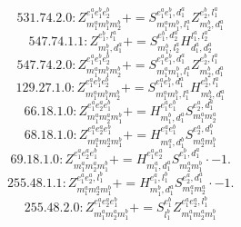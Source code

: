 \documentclass[letterpaper,10pt,fleqn,leqno,onecolumn]{article}
\begin{document}
\begin{equation} \;\;\;\;\;\;  531.74.2.0: Z^{e_{1}^{a}e_{1}^{b}e_{2}^{b}}_{m_{1}^{a}m_{1}^{b}m_{2}^{b}}+=S^{e_{1}^{a}e_{1}^{b},d_{1}^{a}}_{m_{1}^{a}m_{1}^{b},l_{1}^{a}}Z^{e_{2}^{b},l_{1}^{a}}_{m_{2}^{b},d_{1}^{a}} \end{equation}
\begin{equation} \;\;\;\;\;\;  547.74.1.1: Z^{e_{1}^{b},l_{1}^{a}}_{m_{1}^{b},d_{1}^{a}}+=S^{e_{1}^{b},d_{2}^{a}}_{m_{1}^{b},l_{2}^{a}}H^{l_{1}^{a},l_{2}^{a}}_{d_{1}^{a},d_{2}^{a}} \end{equation}
\begin{equation} \;\;\;\;\;\;  547.74.2.0: Z^{e_{1}^{a}e_{1}^{b}e_{2}^{b}}_{m_{1}^{a}m_{1}^{b}m_{2}^{b}}+=S^{e_{1}^{a}e_{1}^{b},d_{1}^{a}}_{m_{1}^{a}m_{1}^{b},l_{1}^{a}}Z^{e_{2}^{b},l_{1}^{a}}_{m_{2}^{b},d_{1}^{a}} \end{equation}
\begin{equation} \;\;\;\;\;\;  129.27.1.0: Z^{e_{1}^{a}e_{1}^{b}e_{2}^{b}}_{m_{1}^{a}m_{1}^{b}m_{2}^{b}}+=S^{e_{1}^{a}e_{1}^{b},d_{1}^{a}}_{m_{1}^{a}m_{1}^{b},l_{1}^{a}}H^{e_{2}^{b},l_{1}^{a}}_{m_{2}^{b},d_{1}^{a}} \end{equation}
\begin{equation} \;\;\;\;\;\;  66.18.1.0: Z^{e_{1}^{a}e_{2}^{a}e_{1}^{b}}_{m_{1}^{a}m_{2}^{a}m_{1}^{b}}+=H^{e_{1}^{a}e_{1}^{b}}_{m_{1}^{b},d_{1}^{a}}S^{e_{2}^{a},d_{1}^{a}}_{m_{1}^{a}m_{2}^{a}} \end{equation}
\begin{equation} \;\;\;\;\;\;  68.18.1.0: Z^{e_{1}^{a}e_{2}^{a}e_{1}^{b}}_{m_{1}^{a}m_{2}^{a}m_{1}^{b}}+=H^{e_{1}^{a}e_{1}^{b}}_{m_{1}^{a},d_{1}^{b}}S^{e_{2}^{a},d_{1}^{b}}_{m_{2}^{a}m_{1}^{b}} \end{equation}
\begin{equation} \;\;\;\;\;\;  69.18.1.0: Z^{e_{1}^{a}e_{2}^{a}e_{1}^{b}}_{m_{1}^{a}m_{2}^{a}m_{1}^{b}}+=H^{e_{1}^{a}e_{2}^{a}}_{m_{1}^{a},d_{1}^{a}}S^{e_{1}^{b},d_{1}^{a}}_{m_{2}^{a}m_{1}^{b}}\cdot -1. \end{equation}
\begin{equation} \;\;\;\;\;\;  255.48.1.1: Z^{e_{1}^{a}e_{2}^{a},l_{1}^{b}}_{m_{1}^{a}m_{2}^{a}m_{1}^{b}}+=H^{e_{1}^{a},l_{1}^{b}}_{m_{1}^{b},d_{1}^{a}}S^{e_{2}^{a},d_{1}^{a}}_{m_{1}^{a}m_{2}^{a}}\cdot -1. \end{equation}
\begin{equation} \;\;\;\;\;\;  255.48.2.0: Z^{e_{1}^{a}e_{2}^{a}e_{1}^{b}}_{m_{1}^{a}m_{2}^{a}m_{1}^{b}}+=S^{e_{1}^{b}}_{l_{1}^{b}}Z^{e_{1}^{a}e_{2}^{a},l_{1}^{b}}_{m_{1}^{a}m_{2}^{a}m_{1}^{b}} \end{equation}
\end{document}

